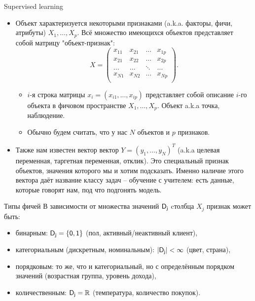 \documentclass[9pt]{beamer}
\begin{document}
\begin{frame}{Supervised learning}
\begin{itemize}
    \item Объект характеризуется некоторыми признаками (a.k.a. факторы, фичи, атрибуты) $X_1, \ldots, X_p$. Всё множество имеющихся объектов представляет собой матрицу "объект-признак":
$$X = \begin{pmatrix}x_{11}&x_{21}&\ldots&x_{1p}\\x_{21}&x_{22}&\ldots&x_{2p}\\\ldots&\ldots&\ddots&\ldots\\x_{N1}&x_{N2}&\ldots&x_{Np}\\\end{pmatrix}.$$
    \begin{itemize}
        \item $i$-я строка матрицы $x_i = (x_{i1}, \ldots, x_{ip})$ представляет собой описание $i$-го объекта в фичовом пространстве $X_1, \ldots, X_p$. Объект a.k.a точка, наблюдение.
        \item Обычно будем считать, что у нас $N$ объектов и $p$ признаков.
    \end{itemize}
    \item Также нам известен вектор вектор $Y = (y_1, \ldots, y_N)^T$  (a.k.a целевая переменная, таргетная переменная, отклик). Это специальный признак объектов, значения которого мы и хотим подсказать.
    Именно наличие этого вектора даёт название классу задач -- обучение с учителем: есть данные, которые говорят нам, под что подгонять модель.
\end{itemize}
\end{frame}

\begin{frame}{Типы фичей}
В зависимости от множества значений $\sf{D}_j$ cтолбца $X_j$ признак может быть:
\begin{itemize}
    \item бинарным: $\sf{D}_j = \{0, 1\}$ (пол, активный/неактивный клиент),
    \item категориальным (дискретным, номинальным): $|\sf{D}_j| < \infty$ (цвет, страна),
    \item порядковым: то же, что и категориальный, но с определённым порядком значений (возрастная группа, уровень дохода),
    \item количественным: $\sf{D}_j = \mathbb{R}$ (температура, количество покупок).
\end{itemize}
\end{frame}
    
\end{document}
